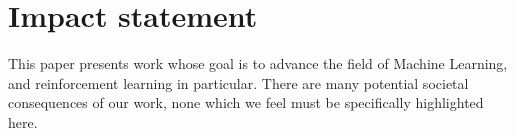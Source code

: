 \section*{Impact statement}
This paper presents work whose goal is to advance the field of Machine Learning, and reinforcement learning in particular. There are many potential societal consequences of our work, none which we feel must be specifically highlighted here.